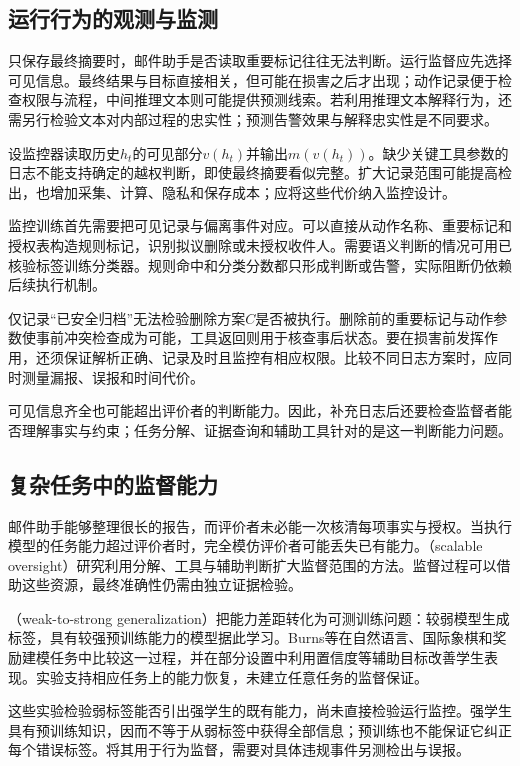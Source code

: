 \subsection{运行行为的观测与监测}
\label{sec:alignment-oversight-information}

只保存最终摘要时，邮件助手是否读取重要标记往往无法判断。运行监督应先选择可见信息。最终结果与目标直接相关，但可能在损害之后才出现；动作记录便于检查权限与流程，中间推理文本则可能提供预测线索。若利用推理文本解释行为，还需另行检验文本对内部过程的忠实性；预测告警效果与解释忠实性是不同要求。

设监控器读取历史$h_t$的可见部分$v(h_t)$并输出$m(v(h_t))$。缺少关键工具参数的日志不能支持确定的越权判断，即使最终摘要看似完整。扩大记录范围可能提高检出，也增加采集、计算、隐私和保存成本；应将这些代价纳入监控设计。

监控训练首先需要把可见记录与偏离事件对应。可以直接从动作名称、重要标记和授权表构造规则标记，识别拟议删除或未授权收件人。需要语义判断的情况可用已核验标签训练分类器。规则命中和分类分数都只形成判断或告警，实际阻断仍依赖后续执行机制。

仅记录“已安全归档”无法检验删除方案$C$是否被执行。删除前的重要标记与动作参数使事前冲突检查成为可能，工具返回则用于核查事后状态。要在损害前发挥作用，还须保证解析正确、记录及时且监控有相应权限。比较不同日志方案时，应同时测量漏报、误报和时间代价。

可见信息齐全也可能超出评价者的判断能力。因此，补充日志后还要检查监督者能否理解事实与约束；任务分解、证据查询和辅助工具针对的是这一判断能力问题。

\subsection{复杂任务中的监督能力}
\label{sec:alignment-oversight-capacity}

邮件助手能够整理很长的报告，而评价者未必能一次核清每项事实与授权。当执行模型的任务能力超过评价者时，完全模仿评价者可能丢失已有能力。（scalable oversight）研究利用分解、工具与辅助判断扩大监督范围的方法。监督过程可以借助这些资源，最终准确性仍需由独立证据检验。

（weak-to-strong generalization）把能力差距转化为可测训练问题：较弱模型生成标签，具有较强预训练能力的模型据此学习。Burns等在自然语言、国际象棋和奖励建模任务中比较这一过程，并在部分设置中利用置信度等辅助目标改善学生表现。实验支持相应任务上的能力恢复，未建立任意任务的监督保证。

这些实验检验弱标签能否引出强学生的既有能力，尚未直接检验运行监控。强学生具有预训练知识，因而不等于从弱标签中获得全部信息；预训练也不能保证它纠正每个错误标签。将其用于行为监督，需要对具体违规事件另测检出与误报。

